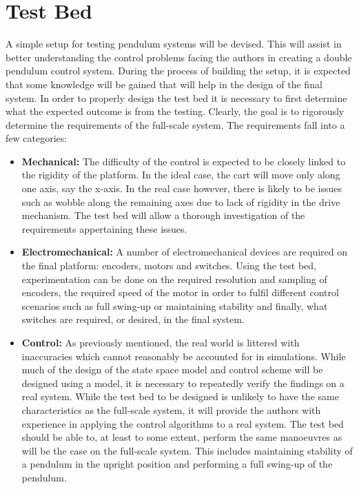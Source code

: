 
\section{Test Bed}
A simple setup for testing pendulum systems will be devised.
This will assist in better understanding the control problems facing the authors in creating a double pendulum control system.
During the process of building the setup, it is expected that some knowledge will be gained that will help in the design of the final system.
In order to properly design the test bed it is necessary to first determine what the expected outcome is from the testing.
Clearly, the goal is to rigorously determine the requirements of the full-scale system.
The requirements fall into a few categories:

\begin{itemize}
	\item \textbf{Mechanical:} The difficulty of the control is expected to be closely linked to the rigidity of the platform.
	In the ideal case, the cart will move only along one axis, say the x-axis.
	In the real case however, there is likely to be issues such as wobble along the remaining axes due to lack of rigidity in the drive mechanism.
	The test bed will allow a thorough investigation of the requirements appertaining these issues.
	\item \textbf{Electromechanical:} A number of electromechanical devices are required on the final platform: encoders, motors and switches.
	Using the test bed, experimentation can be done on the required resolution and sampling of encoders, the required speed of the motor in order to fulfil different control scenarios such as full swing-up or maintaining stability and finally, what switches are required, or desired, in the final system.
	\item \textbf{Control:} As previously mentioned, the real world is littered with inaccuracies which cannot reasonably be accounted for in simulations.
	While much of the design of the state space model and control scheme will be designed using a model, it is necessary to repeatedly verify the findings on a real system.
	While the test bed to be designed is unlikely to have the same characteristics as the full-scale system, it will provide the authors with experience in applying the control algorithms to a real system.
	The test bed should be able to, at least to some extent, perform the same manoeuvres as will be the case on the full-scale system.
	This includes maintaining stability of a pendulum in the upright position and performing a full swing-up of the pendulum.
\end{itemize}

